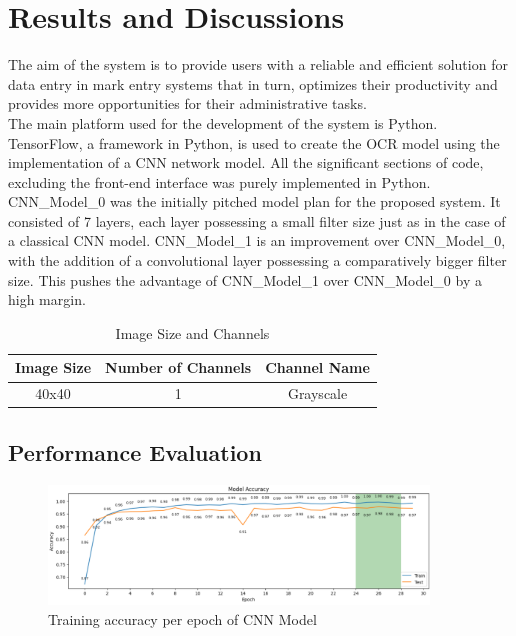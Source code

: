 \chapter{Results and Discussions}
\setcounter{equation}{0}

The aim of the system is to provide users with a reliable and efficient solution for data entry in mark entry systems that in turn, optimizes their productivity and provides more opportunities for their administrative tasks.\\

\noindent The main platform used for the development of the system is Python. TensorFlow, a framework in Python, is used to create the OCR model using the implementation of a CNN network model. All the significant sections of code, excluding the front-end interface was purely implemented in Python.\\

\noindent
CNN\_Model\_0 was the initially pitched model plan for the proposed system. It consisted of 7 layers, each layer possessing a small filter size just as in the case of a classical CNN model. CNN\_Model\_1 is an improvement over CNN\_Model\_0, with the addition of a convolutional layer possessing a comparatively bigger filter size. This pushes the advantage of CNN\_Model\_1 over CNN\_Model\_0 by a high margin.\\
 
\begin{table}[ht]
\centering
\caption{Image Size and Channels}
\begin{tabular}{|c|c|c|}
\hline
Image Size & Number of Channels & Channel Name \\
\hline
40x40 & 1 & Grayscale \\
\hline
\end{tabular}
\end{table}

\clearpage

\section{Performance Evaluation}

\begin{figure}[h!]
    \centering
    \includegraphics[width=0.9\textwidth]{Images/Perf_Eval/acc_vs_epoch.png}
    \caption{Training accuracy per epoch of CNN Model}
\end{figure}

